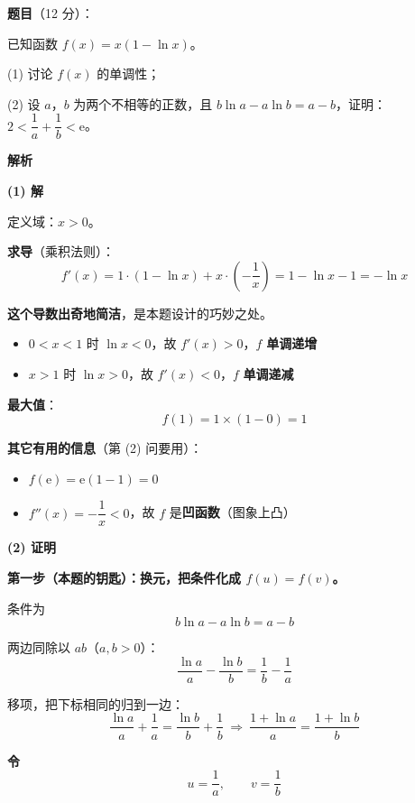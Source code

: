 \begin{answer}

\textbf{题目}（12 分）：

已知函数 $f(x)=x(1-\ln x)$。

  (1) 讨论 $f(x)$ 的单调性；

  (2) 设 $a$，$b$ 为两个不相等的正数，且 $b\ln a-a\ln b=a-b$，证明：$2<\dfrac1a+\dfrac1b<\mathrm e$。

\par\medskip

\textbf{解析}

\par\medskip

\textbf{(1) 解}

定义域：$x>0$。

\textbf{求导}（乘积法则）：
\nopagebreak[4]
\[f'(x)=1\cdot(1-\ln x)+x\cdot\left(-\frac1x\right)=1-\ln x-1=-\ln x\]

\textbf{这个导数出奇地简洁}，是本题设计的巧妙之处。

\begin{itemize}
\item $0<x<1$ 时 $\ln x<0$，故 $f'(x)>0$，$f$ \textbf{单调递增}
\item $x>1$ 时 $\ln x>0$，故 $f'(x)<0$，$f$ \textbf{单调递减}
\end{itemize}

\textbf{最大值}：
\nopagebreak[4]
\[f(1)=1\times(1-0)=1\]

\textbf{其它有用的信息}（第 (2) 问要用）：
\begin{itemize}
\item $f(\mathrm e)=\mathrm e(1-1)=0$
\item $f''(x)=-\dfrac1x<0$，故 $f$ 是\textbf{凹函数}（图象上凸）
\end{itemize}

\par\medskip

\textbf{(2) 证明}

\textbf{第一步（本题的钥匙）：换元，把条件化成 $f(u)=f(v)$。}

条件为
\nopagebreak[4]
\[b\ln a-a\ln b=a-b\]

两边同除以 $ab$（$a,b>0$）：
\nopagebreak[4]
\[\frac{\ln a}a-\frac{\ln b}b=\frac1b-\frac1a\]

移项，把下标相同的归到一边：
\nopagebreak[4]
\[\frac{\ln a}a+\frac1a=\frac{\ln b}b+\frac1b\ \Longrightarrow\ \frac{1+\ln a}a=\frac{1+\ln b}b\]

\textbf{令}
\nopagebreak[4]
\[u=\frac1a,\qquad v=\frac1b\]


\end{answer}
